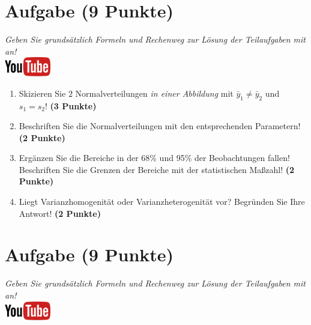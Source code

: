 \documentclass[a4paper, 9pt]{scrartcl}\usepackage[]{graphicx}\usepackage[]{xcolor}
\begin{document}
\section{Aufgabe \hfill (9 Punkte)}

\textit{Geben Sie grunds{\"a}tzlich Formeln und Rechenweg zur L{\"o}sung der
  Teilaufgaben mit an!} \\[1Ex]

\hfill\href{https://youtu.be/ZrJhn2wPbq4}{\includegraphics[width =
  2cm]{img/youtube}}\\[1Ex]



\begin{enumerate}
\item Skizieren Sie $2$ Normalverteilungen \textit{in einer
    Abbildung} mit $\bar{y}_1 \neq \bar{y}_2$ und $s_1 = s_2$! \textbf{(3 Punkte)}
\item Beschriften Sie die Normalverteilungen mit den entsprechenden
  Parametern! \textbf{(2 Punkte)}
\item Erg{\"a}nzen Sie die Bereiche in der 68\% und 95\% der Beobachtungen
  fallen! Beschriften Sie die Grenzen der Bereiche mit der statistischen Ma{\ss}zahl! \textbf{(2 Punkte)}
\item Liegt Varianzhomogenit{\"a}t oder Varianzheterogenit{\"a}t vor? Begr{\"u}nden Sie
  Ihre Antwort! \textbf{(2 Punkte)}
\end{enumerate}

 
\clearpage

\section{Aufgabe \hfill (9 Punkte)}

\textit{Geben Sie grunds{\"a}tzlich Formeln und Rechenweg zur L{\"o}sung der
  Teilaufgaben mit an!} \\[1Ex]

\hfill\href{https://youtu.be/MiD42k4l5Ag}{\includegraphics[width =
  2cm]{img/youtube}}\\[1Ex]
\end{document}
